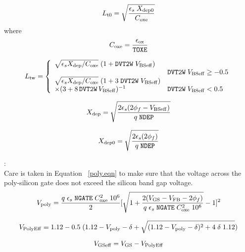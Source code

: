 \documentclass{article}
\begin{document}
\begin{equation}
L_{\rm{t0}} = \sqrt{{\epsilon_s\; X_{\rm{dep0}} \over
C_{\rm{oxe}}}}
\end{equation}
where
\begin{equation}
C_{\rm{oxe}} = {\epsilon_{\rm{ox}} \over \texttt{TOXE}}
\end{equation}

\begin{equation}
L_{\rm{tw}} = \left\{\begin{array}{ll}
       {\sqrt{\epsilon_s X_{\rm{dep}} / C_{\rm{oxe}}}}\;(1 + \texttt{DVT2W}\;V_{\rm{BSeff}}) & \\
                  & \texttt{DVT2W}\;V_{\rm{BSeff}} \geq -0.5\\
       {\sqrt{\epsilon_s X_{\rm{dep}} / C_{\rm{oxe}}}}\;(1 + 3\;\texttt{DVT2W}\;V_{\rm{BSeff}})  & \\
     \times (3 + 8\,\texttt{DVT2W}\,V_{\rm{BSeff}})^{-1} & \texttt{DVT2W}\;V_{\rm{BSeff}} <0.5
              \end{array}
                    \right.
\end{equation}


\begin{equation}
X_{\rm{dep}} = {\sqrt{2 \epsilon_s (2\phi_f - V_{\rm{BSeff}})
\over q \;\texttt{NDEP}}}
\end{equation}

\begin{equation} X_{\rm{dep0}} = {\sqrt{2 \epsilon_s (2\phi_f) \over q \;\texttt{NDEP}}}
\end{equation}

:\\
Care is taken in Equation ~\ref{poly.eqn} to make sure that the
voltage across the poly-silicon gate does not exceed the silicon
band gap voltage.
\begin{equation}
V_{\rm{poly}} = {q \; \epsilon_s \; \texttt{NGATE} \;
C_{\rm{oxe}}^2 \; 10^6 \over 2} [\sqrt{1 + {2(V_{\rm{GS}} -
V_{\rm{FB}} - 2\phi_f) \over q \; \epsilon_s \; \texttt{NGATE} \;
C_{\rm{oxe}}^2 \; 10^6}} - 1]^2
\end{equation}

\begin{equation}
V_{\rm{PolyEff}} = 1.12 - 0.5\;(1.12 - V_{\rm{poly}} - \delta +
\sqrt{(1.12 - V_{\rm{poly}} - \delta)^2 + 4\;\delta\;1.12})
\label{poly.eqn}
\end{equation}

\begin{equation}
V_{\rm{GSeff}} = V_{\rm{GS}} - V_{\rm{PolyEff}}
\end{equation}
\end{document}
